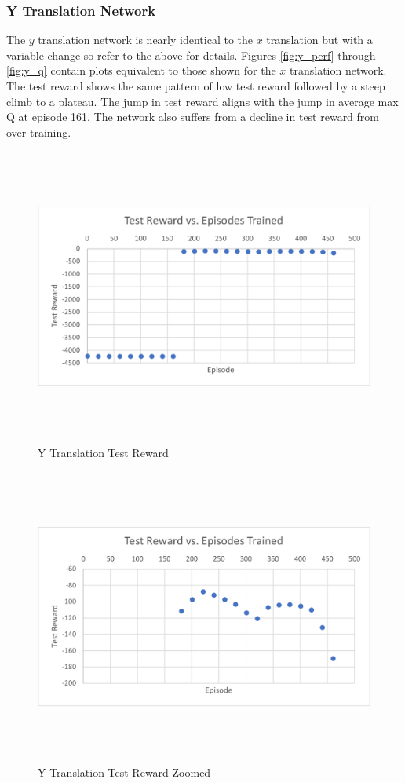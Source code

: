 \subsubsection{Y Translation Network}
The $y$ translation network is nearly identical to the $x$ translation but with a variable change so refer to the above for details. Figures \ref{fig:y_perf} through \ref{fig:y_q} contain plots equivalent to those shown for the $x$ translation network. The test reward shows the same pattern of low test reward followed by a steep climb to a plateau. The jump in test reward aligns with the jump in average max Q at episode 161. The network also suffers from a decline in test reward from over training.
\begin{figure}[H]
	\centering
	\includegraphics[width=6in, height=3.85in, keepaspectratio]{figures/train_figs/y_r.pdf}
	\caption{Y Translation Test Reward} \label{fig:y_r}
\end{figure}
\begin{figure}[H]
	\centering
	\includegraphics[width=6in, height=3.85in, keepaspectratio]{figures/train_figs/y_rzoom.pdf}
	\caption{Y Translation Test Reward Zoomed} \label{fig:y_rzoom}
\end{figure}
